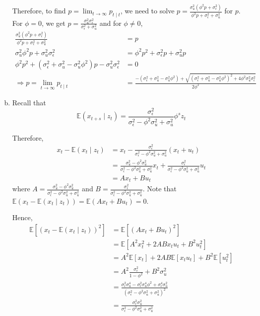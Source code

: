 \documentclass[12pt]{article}
\theoremstyle{definition}
\newcommand\E{\mathbb{E}}
\begin{document}
\begin{enumerate}[(a)]
	Therefore, to find $p=\lim_{t\to \infty}p_{t\mid t}$, we need to solve $p=\frac{\sigma_u^2\left(\phi^2p+\sigma_\epsilon^2\right)}{\phi^2 p+\sigma_\epsilon^2+\sigma_u^2}$ for $p$. For $\phi = 0$, we get $p=\frac{\sigma_u^2\sigma_\epsilon^2}{\sigma_\epsilon^2+\sigma_u^2}$ and for $\phi \neq 0$,
	\begin{align*}
	\frac{\sigma_u^2\left(\phi^2p+\sigma_\epsilon^2\right)}{\phi^2 p+\sigma_\epsilon^2+\sigma_u^2} &= p\\
	\sigma_u^2\phi^2p+\sigma_u^2\sigma_\epsilon^2 &=\phi^2 p^2+\sigma_\epsilon^2p+\sigma_u^2p\\
	\phi^2 p^2 +( \sigma_\epsilon^2+\sigma_u^2 -\sigma_u^2\phi^2)p-\sigma_u^2\sigma_\epsilon^2 &=0\\
	\Rightarrow p  =\lim_{t\to \infty}p_{t\mid t} &= \frac{-( \sigma_\epsilon^2+\sigma_u^2 -\sigma_u^2\phi^2) + \sqrt{(\sigma_\epsilon^2+\sigma_u^2 -\sigma_u^2\phi^2)^2+4\phi^2\sigma_u^2\sigma_\epsilon^2}}{2\phi^2}
	\end{align*}
	
	\item
	
	Recall that
	\[
	\E(x_{t+s}\mid z_t) = \frac{\sigma_\epsilon^2}{\sigma_\epsilon^2-\phi^2\sigma_u^2 + \sigma_u^2}\phi^sz_t
	\]
	
	Therefore,
	\begin{align*}
		x_t-\E(x_{t}\mid z_t) & = x_t - \frac{\sigma_\epsilon^2}{\sigma_\epsilon^2-\phi^2\sigma_u^2 + \sigma_u^2}(x_t+u_t) \\
		& = \frac{ \sigma_u^2 -\phi^2\sigma_u^2 }{\sigma_\epsilon^2-\phi^2\sigma_u^2 + \sigma_u^2}x_t+ \frac{\sigma_\epsilon^2}{\sigma_\epsilon^2-\phi^2\sigma_u^2 + \sigma_u^2}u_t \\
		& = Ax_t+ Bu_t 
	\end{align*}
	where $A=\frac{ \sigma_u^2 -\phi^2\sigma_u^2 }{\sigma_\epsilon^2-\phi^2\sigma_u^2 + \sigma_u^2}$ and $B=\frac{\sigma_\epsilon^2}{\sigma_\epsilon^2-\phi^2\sigma_u^2 + \sigma_u^2}$. Note that $\E(x_t-\E(x_{t}\mid z_t) )= \E(Ax_t+Bu_t)=0$.
	
	Hence,
	\begin{align*}
	\E[(x_t-\E(x_{t}\mid z_t))^2] & = \E[(Ax_t+Bu_t)^2] \\
	& = \E[A^2x_t^2+2ABx_tu_t+B^2u_t^2] \\
	& = A^2\E[x_t]+2AB\E[x_tu_t]+B^2\E[u_t^2] \\
	& = A^2\frac{\sigma_\epsilon^2}{1-\phi^2}+B^2\sigma_u^2 \\
	& = \frac{\sigma_\epsilon^2\sigma_u^4-\sigma_\epsilon^2\sigma_u^4\phi^2+\sigma_\epsilon^4\sigma_u^2}{\left( \sigma_\epsilon^2-\phi^2\sigma_u^2 + \sigma_u^2\right)^2 }\\
	& = \frac{\sigma_\epsilon^2\sigma_u^2}{ \sigma_\epsilon^2-\phi^2\sigma_u^2 + \sigma_u^2}
	\end{align*}
	

\end{enumerate}
\end{document}
